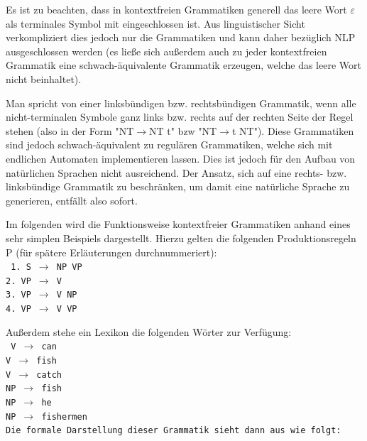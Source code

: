 \documentclass[12pt]{report}
\begin{document}
Es ist zu beachten, dass in kontextfreien Grammatiken generell das leere Wort $\varepsilon$ als terminales Symbol mit eingeschlossen ist. Aus linguistischer Sicht verkompliziert dies jedoch nur die Grammatiken und kann daher bezüglich NLP ausgeschlossen werden (es ließe sich außerdem auch zu jeder kontextfreien Grammatik eine schwach-äquivalente Grammatik erzeugen, welche das leere Wort nicht beinhaltet).

Man spricht von einer linksbündigen bzw. rechtsbündigen Grammatik, wenn alle nicht-terminalen Symbole ganz links bzw. rechts auf der rechten Seite der Regel stehen (also in der Form "NT$\rightarrow$NT t" bzw "NT$\rightarrow$t NT"). Diese Grammatiken sind jedoch schwach-äquivalent zu regulären Grammatiken, welche sich mit endlichen Automaten implementieren lassen. Dies ist jedoch für den Aufbau von natürlichen Sprachen nicht ausreichend. Der Ansatz, sich auf eine rechts- bzw. linksbündige Grammatik zu beschränken, um damit eine natürliche Sprache zu generieren, entfällt also sofort. 

Im folgenden wird die Funktionsweise kontextfreier Grammatiken anhand eines sehr simplen Beispiels dargestellt. Hierzu gelten die folgenden Produktionsregeln P (für spätere Erläuterungen durchnummeriert):
\newline
\\
\tt
1. S $\rightarrow$ NP VP\\
2. VP $\rightarrow$ V\\
3. VP $\rightarrow$ V NP\\
4. VP $\rightarrow$ V VP\\

\rm

Außerdem stehe ein Lexikon die folgenden Wörter zur Verfügung:
\newline
\\
\tt
V $\rightarrow$ can\\
V $\rightarrow$ fish\\
V $\rightarrow$ catch\\
NP $\rightarrow$ fish\\
NP $\rightarrow$ he\\
NP $\rightarrow$ fishermen\\
\rm 
\newline
Die formale Darstellung dieser Grammatik sieht dann aus wie folgt:
\end{document}
